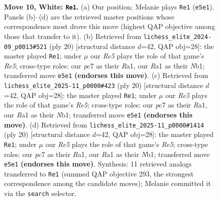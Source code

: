 \documentclass[11pt]{article}
\begin{document}
\begin{figure}[p]
\caption{\textbf{Move 10, White: \texttt{Re1}.} (a) Our position; Melanie plays \texttt{Re1} (\texttt{e5e1}). Panels (b)--(d) are the retrieved master positions whose correspondence most drove this move (highest QAP objective among those that transfer to it). (b) Retrieved from \texttt{lichess\_elite\_2024-09\_p0013\#521} (ply 20) [structural distance $d$=42, QAP obj=28]: the master played \texttt{Re1}; under $\mu$ our \emph{Re5} plays the role of that game's \emph{Re5}; cross-type roles: our \emph{p}c7 as their \emph{R}a1, our \emph{R}a1 as their \emph{N}b1; transferred move \texttt{e5e1} \textbf{(endorses this move)}. (c) Retrieved from \texttt{lichess\_elite\_2025-11\_p0000\#423} (ply 20) [structural distance $d$=42, QAP obj=28]: the master played \texttt{Re1}; under $\mu$ our \emph{Re5} plays the role of that game's \emph{Re5}; cross-type roles: our \emph{p}c7 as their \emph{R}a1, our \emph{R}a1 as their \emph{N}b1; transferred move \texttt{e5e1} \textbf{(endorses this move)}. (d) Retrieved from \texttt{lichess\_elite\_2025-11\_p0000\#1414} (ply 20) [structural distance $d$=42, QAP obj=28]: the master played \texttt{Re1}; under $\mu$ our \emph{Re5} plays the role of that game's \emph{Re5}; cross-type roles: our \emph{p}c7 as their \emph{R}a1, our \emph{R}a1 as their \emph{N}b1; transferred move \texttt{e5e1} \textbf{(endorses this move)}. Synthesis: 11 retrieved analogs transferred to \texttt{Re1} (summed QAP objective 293, the strongest correspondence among the candidate moves); Melanie committed it via the \texttt{search} selector.}
\label{fig:thought-m18}
\end{figure}

\clearpage
\end{document}
